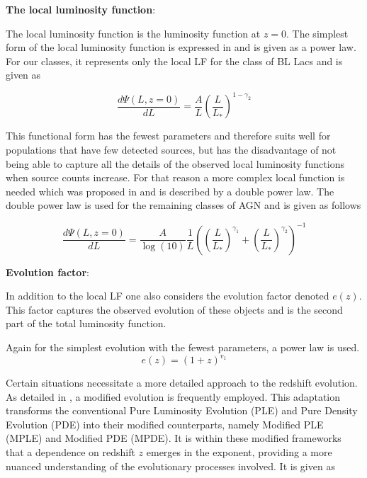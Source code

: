 \textbf{The local luminosity function}:

The local luminosity function is the luminosity function at $z=0$.
The simplest form of the local luminosity function is expressed in \cite{Ajello_2009} and is given as a power law. For our classes, it represents only the local LF for the class of BL Lacs 
and is given as

\begin{equation}
    \frac{d\Psi(L,z=0)}{dL} = \frac{A}{L} \left( \frac{L}{L_*}\right)^{1-\gamma_2}
\end{equation}

This functional form has the fewest parameters and therefore suits well for populations that have few detected sources, but has the disadvantage of not being able to capture all the details of the observed local luminosity functions when source counts increase.
For that reason a more complex local function is needed which was proposed in \cite{Ueda_2003} and is described by a double power law.
The double power law is used for the remaining classes of AGN and is given as follows


   
\begin{equation}
    \frac{d\Psi(L,z=0)}{dL} =  \frac{A}{\log(10)} \frac{1}{L} \left( \left( \frac{L}{L_*} \right)^{\gamma_1} + \left( \frac{L}{L_*} \right)^{\gamma_2} \right)^{-1}
\end{equation}



\textbf{Evolution factor}:

In addition to the local LF one also considers the evolution factor denoted $e(z)$. This factor captures the observed evolution of these objects and is the second part of the total luminosity function.

Again for the simplest evolution with the fewest parameters, a power law is used.
 $$
e(z) = (1 + z)^{v_1 }
 $$


  
Certain situations necessitate a more detailed approach to the redshift evolution. 
 As detailed in \cite{Ajello_2009}, a modified evolution is frequently employed. 
 This adaptation transforms the conventional Pure Luminosity Evolution (PLE) and Pure Density Evolution 
 (PDE) into their modified counterparts, namely Modified PLE (MPLE) and Modified PDE (MPDE).
It is within these modified frameworks that a dependence on redshift $z$ emerges in the exponent,
providing a more nuanced understanding of the evolutionary processes involved. It is given as

